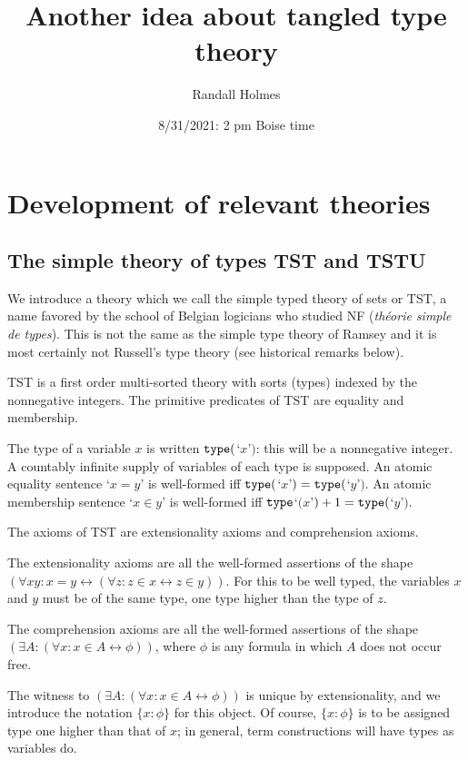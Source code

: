 \documentclass[12pt]{article}
\title{Another idea about tangled type theory}
\author{Randall Holmes}
\date{8/31/2021:  2 pm Boise time}
\begin{document}
\maketitle

\tableofcontents

\newpage

\section{Development of relevant theories}

\subsection{The simple theory of types TST and TSTU}

We introduce a theory which we call the simple typed theory of sets or TST, a name favored by the school of Belgian logicians who studied NF ({\em th\'eorie simple de types}).  This is not the same as the simple type theory of Ramsey and it is most certainly not Russell's type theory  (see historical remarks below).

TST is a first order multi-sorted theory with sorts (types) indexed by the nonnegative integers.  The primitive predicates of TST are equality and membership.

The type of a variable $x$ is written ${\tt type}($`$x$'$)$:  this will be a nonnegative integer.   A countably infinite supply of variables of each type is supposed.  An atomic equality sentence `$x=y$' is well-formed iff ${\tt type}($`$x$'$)={\tt type}($`$y$'$)$.
An atomic membership sentence `$x \in y$' is well-formed iff ${\tt type}$`$(x$'$)+1 = {\tt type}($`$y$'$)$.

The axioms of TST are extensionality axioms and comprehension axioms.

The extensionality axioms are all the well-formed assertions of the shape $(\forall xy:x=y \leftrightarrow (\forall z:z \in x \leftrightarrow z\in y))$.  For this to be well typed, the variables
$x$ and $y$ must be of the same type, one type higher than the type of $z$.

The comprehension axioms are all the well-formed assertions of the shape $(\exists A:(\forall x:x \in A \leftrightarrow \phi))$, where $\phi$ is any formula in which $A$ does not occur free.

The witness to $(\exists A:(\forall x:x \in A \leftrightarrow \phi))$ is unique by extensionality, and we introduce the notation $\{x:\phi\}$ for this object.  Of course, $\{x:\phi\}$  is to be assigned type one higher than that of $x$;  in general, term constructions will have types as variables do.
\end{document}
